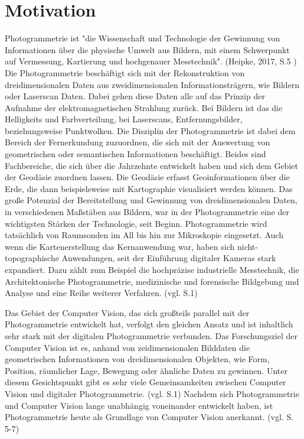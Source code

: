 \chapter{Motivation}

Photogrammetrie ist "die Wissenschaft und Technologie der Gewinnung von Informationen
über die physische Umwelt aus Bildern, mit einem Schwerpunkt auf Vermessung,
Kartierung und hochgenauer Messtechnik". (Heipke, 2017, S.5 \cite{photo})  Die Photogrammetrie beschäftigt sich  mit der Rekonstruktion von dreidimensionalen Daten aus zweidimensionalen Informationsträgern, wie Bildern oder Laserscan Daten. Dabei gehen diese Daten alle auf das Prinzip der Aufnahme der elektromagnetischen Strahlung zurück. Bei Bildern ist das die Helligkeits und Farbverteilung, bei Laserscans, Entfernungsbilder, beziehungsweise Punktwolken. Die Disziplin der Photogrammetrie ist dabei dem Bereich der Fernerkundung zuzuordnen, die sich mit der Auswertung von geometrischen oder semantischen Informationen beschäftigt. Beides sind Fachbereiche, die sich über die Jahrzehnte entwickelt haben und sich dem Gebiet der Geodäsie zuordnen lassen. Die Geodäsie erfasst Geoinformationen über die Erde, die dann beispielsweise mit Kartographie visualisiert werden können. Das große Potenzial der Bereitstellung und Gewinnung von dreidimensionalen Daten, in verschiedenen Maßstäben aus Bildern, war in der Photogrammetrie eine der wichtigsten Stärken der Technologie, seit Beginn. Photogrammetrie wird tatsächlich von Raumsonden im All bis hin zur Mikroskopie eingesetzt. Auch wenn die Kartenerstellung das Kernanwendung war, haben sich nicht-topographische Anwendungen, seit der Einführung digitaler Kameras stark expandiert. Dazu zählt zum Beispiel die hochpräzise industrielle Messtechnik, die Architektonische Photogrammetrie, medizinische und forensische Bildgebung und Analyse und eine Reihe weiterer Verfahren. (vgl. \cite{state_of_art} S.1)


Das Gebiet der Computer Vision, das sich großteils parallel mit der Photogrammetrie entwickelt hat, verfolgt den gleichen Ansatz und ist inhaltlich sehr stark mit der digitalen Photogrammetrie verbunden. Das Forschungsziel der Computer Vision ist es, anhand von zeidimensionalen Bilddaten die geometrischen Informationen von dreidimensionalen Objekten, wie Form, Position, räumlicher Lage, Bewegung oder ähnliche Daten zu gewinnen. Unter diesem Gesichtspunkt gibt es sehr viele Gemeinsamkeiten zwischen Computer Vision und digitaler Photogrammetrie. (vgl. \cite{pose_est_epi} S.1) Nachdem sich Photogrammetrie und Computer Vision lange unabhängig voneinander entwickelt haben, ist Photogrammetrie heute als Grundlage von Computer Vision anerkannt. (vgl. \cite{photo} S. 5-7)

